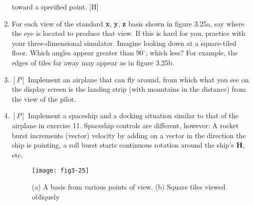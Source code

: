 \documentclass{book}
\begin{document}
\begin{enumerate}
toward a specified point. [H]
\item For each view of the standard \textbf{x}, \textbf{y}, \textbf{z} basis shown in figure 3.25a, say
where the eye is located to produce that view. If this is hard for you,
practice with your three-dimensional simulator. Imagine looking down
at a square-tiled floor. Which angles appear greater than $90^{\circ}$; which
less? For example, the edges of tiles far away may appear as in figure
3.25b.
\item $[P]$ Implement an airplane that can fly around, from which what
you see on the display screen is the landing strip (with mountains in the
distance) from the view of the pilot.
\item $[P]$ Implement a spaceship and a docking situation similar to that
of the airplane in exercise 11. Spaceship controls are different, however:
A rocket burst increments (vector) velocity by adding on a vector in
the direction the ship is pointing, a roll burst starts continuous rotation
around the ship's \textbf{H}, etc.

\begin{figure}
\begin{center}
\texttt{[image: fig3-25]}
\caption{(a) A basis from various points of view. (b) Square tiles viewed obliquely}
\end{center}
\end{figure}


\end{enumerate}
\end{document}
